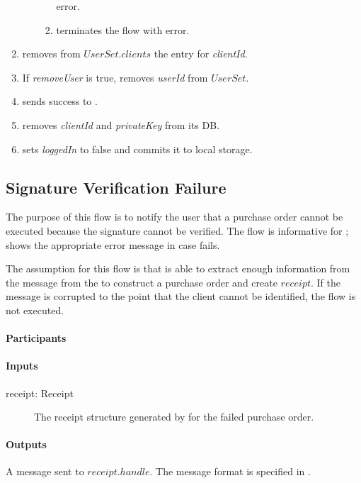\documentclass[a4paper,10pt,draft]{article}
\newcommand{\privateKey}{\emph{privateKey}}
\newcommand{\userId}{\emph{userId}}
\newcommand{\clientId}{\emph{clientId}}
\newcommand{\loggedIn}{\emph{loggedIn}}
\newcommand{\removeUser}{\emph{removeUser}}
\begin{document}
\begin{enumerate}
\begin{enumerate}
\begin{enumerate}
error.
   \item \Client{} terminates the flow with error.
  \end{enumerate}
 \end{enumerate}
 \item\label{delete_client:first} \Server{} removes from $UserSet.clients$ the 
entry for \clientId{}.
 \item If \removeUser{} is true, \Server{} removes \userId{} from $UserSet$.
 \item \Server{} sends success to \Client{}.
 \item \Client{} removes \clientId{} and \privateKey{} from its DB.
 \item \Client{} sets \loggedIn{} to false and commits it to local storage.
\end{enumerate}

\subsection{Signature Verification Failure}
\label{signature_failed_flow}
The purpose of this flow is to notify the user that a purchase order cannot be 
executed because the signature cannot be verified. The flow is informative for 
\User{}; \Client{} shows the appropriate error message in case 
 fails.

The assumption for this flow is that \Server{} is able to extract enough 
information from the message from the \Client{} to construct a purchase order 
and create $receipt$. If the message is corrupted to the point that the client 
cannot be identified, the flow is not executed.

\paragraph{Participants} \Server{}

\paragraph{Inputs}
\SpecialItem
\begin{description}
 \item[receipt: Receipt] The receipt structure generated by \Server{} for the 
failed purchase order.
\end{description}

\paragraph{Outputs}
A message sent to $receipt.handle$. The message format is specified 
in \cite{UI_spec}.
\end{document}
